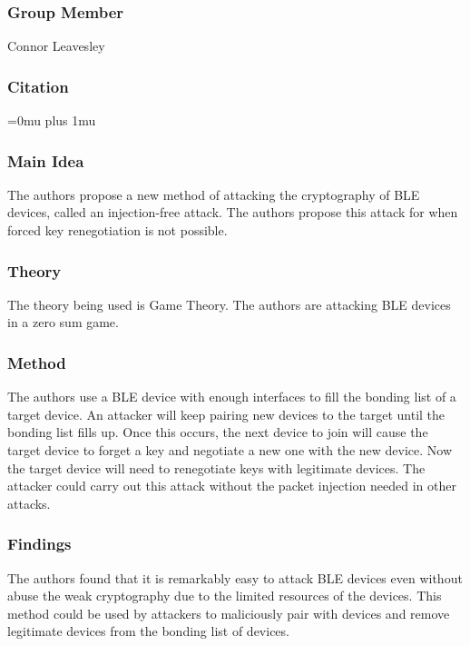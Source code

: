 \subsubsection{Group Member}

\noindent
Connor Leavesley

\noindent
\subsubsection{Citation}

\Urlmuskip=0mu plus 1mu\relax

\subsubsection{Main Idea}

\noindent
The authors propose a new method of attacking the cryptography of BLE devices, called an injection-free attack. The authors propose this attack for when forced key renegotiation is not possible.

\subsubsection{Theory}

\noindent
The theory being used is Game Theory. The authors are attacking BLE devices in a zero sum game. 

\subsubsection{Method}

\noindent
The authors use a BLE device with enough interfaces to fill the bonding list of a target device. An attacker will keep pairing new devices to the target until the bonding list fills up. Once this occurs, the next device to join will cause the target device to forget a key and negotiate a new one with the new device. Now the target device will need to renegotiate keys with legitimate devices. The attacker could carry out this attack without the packet injection needed in other attacks.

\subsubsection{Findings}

\noindent
The authors found that it is remarkably easy to attack BLE devices even without abuse the weak cryptography due to the limited resources of the devices. This method could be used by attackers to maliciously pair with devices and remove legitimate devices from the bonding list of devices.

